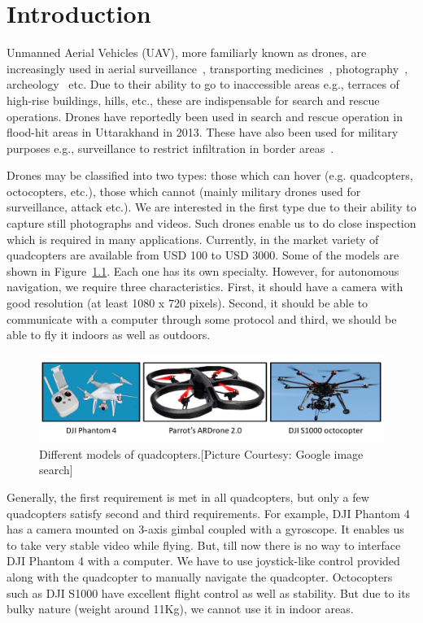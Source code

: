 \chapter{Introduction}
\label{ch:intro}
Unmanned Aerial Vehicles (UAV), more familiarly known as drones, are
increasingly used in aerial
surveillance~\cite{dronesurvey1, dronesurvey3}, transporting
medicines~\cite{dronedelivery1,dronedelivery2}, photography~\cite{dronephoto1,
dronephoto2, dronephoto3}, archeology~\cite{dronearchaeology} etc.
Due to their ability to go to inaccessible areas e.g., terraces of high-rise
buildings, hills, etc., these are indispensable for search and rescue
operations. Drones have reportedly been used in search and rescue operation in
flood-hit areas in Uttarakhand in 2013. These have also been used for military
purposes e.g., surveillance to restrict infiltration in border
areas~\cite{dronesurvey2}.

Drones may be classified into two types: those which can hover (e.g.
quadcopters, octocopters, etc.), those which cannot (mainly military drones
used for surveillance, attack etc.). We are interested in the first type due
to their ability to capture still photographs and videos. Such drones enable us
to do close inspection which is required in many applications. Currently, in the market variety of
quadcopters are available from USD 100 to USD 3000. Some of the models are shown
in Figure~\ref{fig:quadcopters}.
Each one has its own specialty. However, for autonomous navigation, we require 
three characteristics. First, it should have a camera with good resolution (at
least 1080 x 720 pixels). Second, it should be able to communicate with a
computer through some protocol and third, we should be able to fly it indoors as
well as outdoors.

\begin{figure}[h!]
\centering
\includegraphics[width=0.98\linewidth]{figures/quadcopters}
\caption[Different models of quadcopters]{Different models of
quadcopters.[Picture Courtesy: Google image search]}
\label{fig:quadcopters}
\end{figure}

Generally, the first requirement is met in all quadcopters, but only a few
quadcopters satisfy second and third requirements. For example, DJI Phantom 4
 has a camera mounted on 3-axis gimbal coupled with a gyroscope. It enables
us to take very stable video while flying. But, till now there is no way to interface DJI
Phantom 4 with a computer. We have to use joystick-like control provided along
with the quadcopter to manually navigate the quadcopter.
Octocopters such as  DJI S1000 have excellent flight control as well as
stability. But due to its bulky nature (weight around 11Kg), we cannot use it
in indoor areas.

